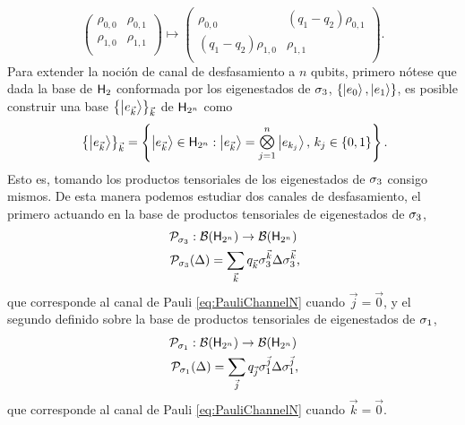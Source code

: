 \begin{equation}
    \begin{pmatrix}
        \rho_{0,0} & \rho_{0,1}\\
        \rho_{1,0} & \rho_{1,1}\\
    \end{pmatrix}\mapsto\begin{pmatrix}
        \rho_{0,0} & (q_{1}-q_{2})\rho_{0,1}\\
        (q_{1}-q_{2})\rho_{1,0} & \rho_{1,1}\\
    \end{pmatrix}.\nonumber
\end{equation}
Para extender la noción de canal de desfasamiento a $n$ qubits, primero nótese que dada la base de ${\sf H}_{2}$ conformada por los eigenestados de $\sigma_{3}$, $\{\ket{e_{0}},\ket{e_{1}}\}$, es posible construir una base $\left\{\ket{e_{\vec{k}}}\right\}_{\vec{k}}$ de ${\sf H}_{2^{n}}$ como
\begin{equation}
    \left\{\ket{e_{\vec{k}}}\right\}_{\vec{k}}=\left\{\ket{e_{\vec{k}}}\in\hilbert_{2^{n}}: \ket{e_{\vec{k}}}=\Motimes_{j=1}^{n}\ket{e_{k_{j}}},\,k_{j}\in\{0,1\}\right\} \rlap{.}\nonumber
\end{equation}
Esto es, tomando los productos tensoriales de los eigenestados de $\sigma_{3}$ consigo mismos. De esta manera podemos estudiar dos canales de desfasamiento, el primero actuando en la base de productos tensoriales de eigenestados de $\sigma_{3}$,
\begin{gather}
    \mcP_{\pauli{3}}:\mcB(\hilbert_{2^{n}}) \rightarrow \mcB(\hilbert_{2^{n}})\nonumber\\
    \mcP_{\pauli{3}}(\Delta)=\sum_{\vec{k}}q_{\vec{k}}\pauli{3}^{\vec{k}}\Delta\pauli{3}^{\vec{k}}\rlap{,}\nonumber
\end{gather}
que corresponde al canal de Pauli \ref{eq:PauliChannelN} cuando $\vec{j}=\vec{0}$, y el segundo definido sobre la base de productos tensoriales de eigenestados de $\sigma_{1}$,
\begin{gather}
    \mcP_{\pauli{1}}:\mcB(\hilbert_{2^{n}}) \rightarrow \mcB(\hilbert_{2^{n}})\nonumber\\
    \mcP_{\pauli{1}}(\Delta)=\sum_{\vec{j}}q_{\vec{j}}\pauli{1}^{\vec{j}}\Delta\pauli{1}^{\vec{j}}\rlap{,}\nonumber
\end{gather}
que corresponde al canal de Pauli \ref{eq:PauliChannelN} cuando $\vec{k}=\vec{0}$.   

